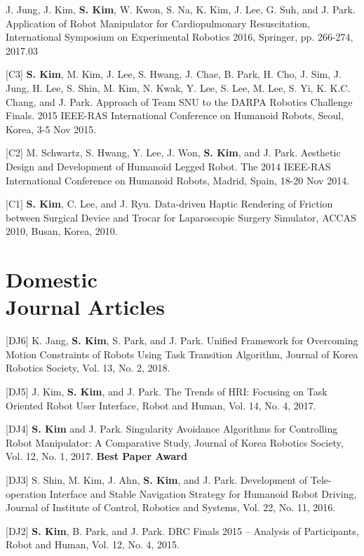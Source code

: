 \documentclass[margin,line]{res}
\begin{document}
\begin{resume}
    [C4] J. Jung, J. Kim, \textbf{S. Kim}, W. Kwon, S. Na, K. Kim, J. Lee, G. Suh, and J. Park.
  Application of Robot Manipulator for Cardiopulmonary Resuscitation,  International Symposium on Experimental Robotics 2016, Springer, pp. 266-274, 2017.03

    [C3] \textbf{S. Kim}, M. Kim, J. Lee, S. Hwang, J. Chae, B. Park, H. Cho, J. Sim, J. Jung, H. Lee, S. Shin, M. Kim, N. Kwak, Y. Lee, S. Lee, M. Lee, S. Yi, K. K.C. Chang, and {J. Park}.
  Approach of Team SNU to the DARPA Robotics Challenge Finals.
  2015 IEEE-RAS International Conference on Humanoid Robots,
  Seoul, Korea, 3-5 Nov 2015.

    [C2] M. Schwartz, S. Hwang, Y. Lee, J. Won, \textbf{S. Kim}, and {J. Park}.
  Aesthetic Design and Development of Humanoid Legged Robot.
  The 2014 IEEE-RAS International Conference on Humanoid Robots,
  Madrid, Spain, 18-20 Nov 2014.

    [C1] \textbf{S. Kim}, C. Lee, and J. Ryu.
  Data-driven Haptic Rendering of Friction between Surgical Device and Trocar for Laparoscopic Surgery Simulator,
  ACCAS 2010, Busan, Korea, 2010.

  \section{\sc Domestic \\ Journal Articles}

   [DJ6] K. Jang, \textbf{S. Kim}, S. Park, and J. Park.
  Unified Framework for Overcoming Motion Constraints of Robots Using Task Transition Algorithm,
  Journal of Korea Robotics Society, Vol. 13, No. 2, 2018.

    [DJ5] J. Kim, \textbf{S. Kim}, and {J. Park}.
  The Trends of HRI: Focusing on Task Oriented Robot User Interface,
  Robot and Human,
  Vol. 14, No. 4, 2017.

    [DJ4] \textbf{S. Kim} and {J. Park}.
  Singularity Avoidance Algorithms for Controlling Robot Manipulator: A Comparative Study,
  Journal of Korea Robotics Society, Vol. 12, No. 1, 2017. \textbf{Best Paper Award}

  [DJ3] S. Shin, M. Kim, J. Ahn, \textbf{S. Kim}, and J. Park.
  Development of Tele-operation Interface and Stable Navigation Strategy for Humanoid Robot Driving,
  Journal of Institute of Control, Robotics and Systems, Vol. 22, No. 11, 2016.

    [DJ2] \textbf{S. Kim}, B. Park, and {J. Park}.
  DRC Finals 2015 – Analysis of Participants,
  Robot and Human,
  Vol. 12, No. 4, 2015.


\end{resume}
\end{document}
